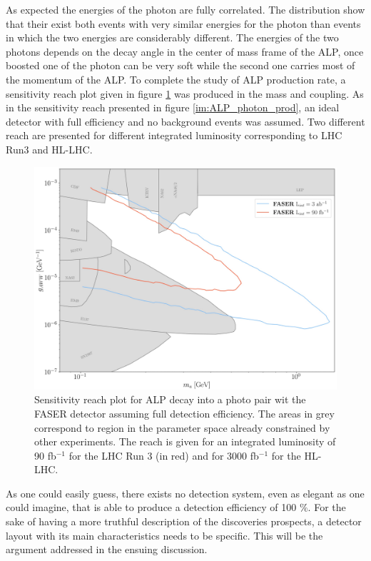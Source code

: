 		As expected the energies of the photon are fully correlated. The distribution show that their exist both events with very similar energies for the photon than events in which the two energies are considerably different. The energies of the two photons depends on the decay angle in the center of mass frame of the ALP, once boosted one of the photon can be very soft while the second one carries most of the momentum of the ALP. To complete the study of ALP production rate, a sensitivity reach plot given in figure \ref{im:reach_plot_ideal} was produced in the mass and coupling. As in the sensitivity reach presented in figure \ref{im:ALP_photon_prod}, an ideal detector with full efficiency and no background events was assumed. Two different reach are presented for different integrated luminosity corresponding to LHC Run3 and HL-LHC.
		\begin{figure}[h]
			\centering
			\includegraphics[width=0.8\linewidth]{files/reach_plot_ideal}
			\caption{Sensitivity reach plot for ALP decay into a photo pair wit the FASER detector assuming full detection efficiency. The areas in grey correspond to region in the parameter space already constrained by other experiments. The reach is given for an integrated luminosity of 90 fb$^{-1}$ for the LHC Run 3 (in red) and for 3000 fb$^{-1}$ for the HL-LHC.}
			\label{im:reach_plot_ideal}
		\end{figure}
		
		As one could easily guess, there exists no detection system, even as elegant as one could imagine, that is able to produce a detection efficiency of 100 $\%$. For the sake of having a more truthful description of the discoveries prospects, a detector layout with its main characteristics needs to be specific. This will be the argument addressed in the ensuing discussion. 
		
